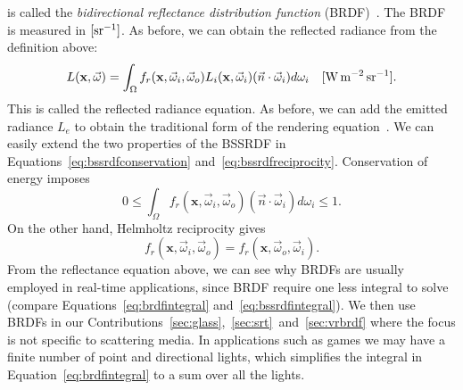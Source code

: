 is called the \emph{bidirectional reflectance distribution function} (BRDF)~\cite{Nicodemus1977}. The BRDF is measured in $\siunitnospace{\per \steradian}$. As before, we can obtain the reflected radiance from the definition above:
\begin{equation}
\label{eq:brdfintegral}
L(\mathbf{x}, \vec{\omega}) = \int_\Omega f_r(\mathbf{x}, \vec{\omega}_i,  \vec{\omega}_o) L_i(\mathbf{x}, \vec{\omega}_i) (\vec{n} \cdot \vec{\omega}_i) d{\omega}_i  \siunit{\watt \per \square \metre \per \steradian}.
\end{equation}
This is called the reflected radiance equation. As before, we can add the emitted radiance $L_e$ to obtain the traditional form of the rendering equation~\cite{Kajiya1986}. We can easily extend the two properties of the BSSRDF in Equations~\ref{eq:bssrdfconservation} and~\ref{eq:bssrdfreciprocity}. Conservation of energy imposes
\begin{equation*}
0 \leq \int_\Omega f_r(\mathbf{x}, \vec{\omega}_i,  \vec{\omega}_o)  (\vec{n} \cdot \vec{\omega}_i) d{\omega}_i \leq 1.
\end{equation*}
On the other hand, Helmholtz reciprocity gives
\begin{equation*}
f_r(\mathbf{x}, \vec{\omega}_i,  \vec{\omega}_o) = f_r(\mathbf{x}, \vec{\omega}_o,  \vec{\omega}_i).
\end{equation*}
From the reflectance equation above, we can see why BRDFs are usually employed in real-time applications, since BRDF require one less integral to solve (compare Equations~\ref{eq:brdfintegral} and~\ref{eq:bssrdfintegral}). We then use BRDFs in our Contributions~\ref{sec:glass},~\ref{sec:srt}~and~\ref{sec:vrbrdf} where the focus is not specific to scattering media. In applications such as games we may have a finite number of point and directional lights, which simplifies the integral in Equation~\ref{eq:brdfintegral} to a sum over all the lights.

